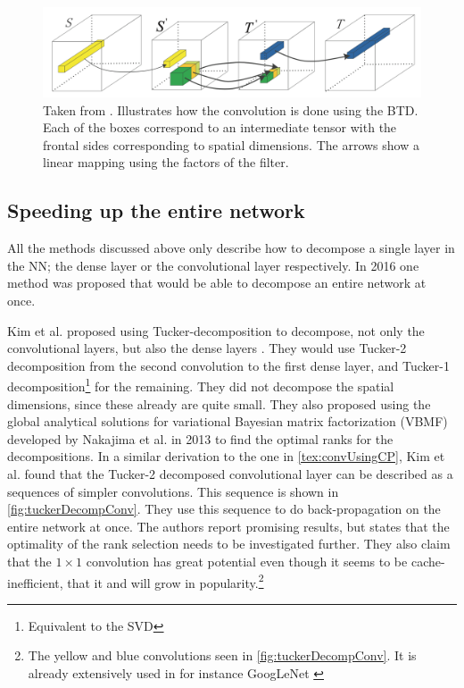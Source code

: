 \begin{figure}
    \centering
    \includegraphics[width=.8\linewidth]{Pics/03_Previous_work/BTD_conv_decomp.png}
    \captionsetup{width=.85\linewidth}
    \caption{Taken from \cite{Wang2016}. Illustrates how the convolution is done using the BTD. Each of the boxes correspond to an intermediate tensor with the frontal sides corresponding to spatial dimensions. The arrows show a linear mapping using the factors of the filter.}
    \label{fig:BTD_conv_decomp}
\end{figure}

\subsection{Speeding up the entire network} \label{tex:sub_entire_network}
All the methods discussed above only describe how to decompose a single layer in the NN; the dense layer or the convolutional layer respectively. In 2016 one method was proposed that would be able to decompose an entire network at once.

Kim et al. proposed using Tucker-decomposition to decompose, not only the convolutional layers, but also the dense layers \cite{Kim2016}. They would use Tucker-2 decomposition from the second convolution to the first dense layer, and Tucker-1 decomposition\footnote{Equivalent to the SVD} for the remaining. They did not decompose the spatial dimensions, since these already are quite small. They also proposed using the global analytical solutions for variational Bayesian matrix factorization (VBMF) developed by Nakajima et al. in 2013 \cite{Nakajima2013} to find the optimal ranks for the decompositions. In a similar derivation to the one in \autoref{tex:convUsingCP}, Kim et al. found that the Tucker-2 decomposed convolutional layer can be described as a sequences of simpler convolutions. This sequence is shown in \autoref{fig:tuckerDecompConv}. They use this sequence to do back-propagation on the entire network at once. The authors report promising results, but states that the optimality of the rank selection needs to be investigated further. They also claim that the $1\times 1$ convolution has great potential even though it seems to be cache-inefficient, that it and will grow in popularity.\footnote{The yellow and blue convolutions seen in \autoref{fig:tuckerDecompConv}. It is already extensively used in for instance GoogLeNet \cite{Szegedy2015}}

